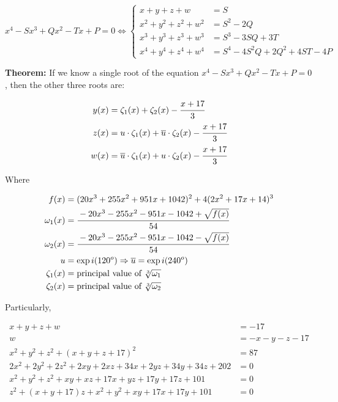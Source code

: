 \documentclass[11pt,a4paper]{article}
\begin{document}
\begin{equation*}
x^4 - Sx^3 + Qx^2 - Tx + P = 0 \Leftrightarrow \left\{\begin{aligned}
x + y + z + w &= S \\
x^2 + y^2 + z^2 + w^2 &= S^2 - 2 Q \\
x^3 + y^3 + z^3 + w^3 &= S^3 - 3SQ + 3T \\
x^4 + y^4 + z^4 + w^4 &= S^4 - 4S^2Q + 2Q^2 + 4ST - 4P
\end{aligned}\right.
\end{equation*}

\textbf{Theorem: }If we know a single root of the equation $x^4 - Sx^3 + Qx^2 - Tx + P = 0$, then the other three roots are:

\begin{align}
y(x) &= \zeta_1(x) + \zeta_2(x) - \cfrac{x + 17}{3} \\
z(x) &= u \cdot \zeta_1(x) + \overline{u} \cdot \zeta_2(x) - \cfrac{x + 17}{3} \\
w(x) &= \overline{u} \cdot \zeta_1(x) + u \cdot \zeta_2(x) - \cfrac{x + 17}{3}
\end{align}

Where

\begin{align}
f(x) &= (20x^3 + 255x^2 + 951 x + 1042)^2 + 4 (2x^2 + 17x + 14)^3 \\
\omega_1(x) &= \cfrac{-20x^3 - 255x^2 - 951 x - 1042 + \sqrt{f(x)}}{54} \\
\omega_2(x) &= \cfrac{-20x^3 - 255x^2 - 951 x - 1042 - \sqrt{f(x)}}{54} \\
u &= \exp i(120^o) \Rightarrow \overline{u} = \exp i(240^o) \\
\zeta_1(x) &= \text{principal value of } \sqrt[3]{\omega_1} \\
\zeta_2(x) &= \text{principal value of } \sqrt[3]{\omega_2} \\
\end{align}

Particularly,

\begin{align}
x + y + z + w &= -17 \\
w &= - x - y - z - 17 \\
x^2 + y^2 + z^2 + (x + y + z + 17)^2 &= 87 \\
2x^2 + 2y^2 + 2z^2 + 2xy + 2xz + 34x + 2yz + 34y + 34z + 202 &= 0 \\
x^2 + y^2 + z^2 + xy + xz + 17x + yz + 17y + 17z + 101 &= 0 \\
z^2 + (x + y + 17)z + x^2 + y^2 + xy + 17x + 17y + 101 &= 0
\end{align}
\end{document}
